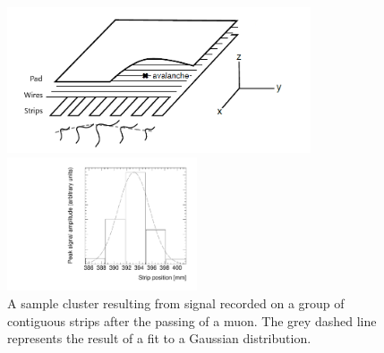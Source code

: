 \newpage
\thispagestyle{empty}
\begin{figure}
    \centering
    \includegraphics[width = 0.8\textwidth]{figures/mwpc_lefebvre_thesis_gatti.png}
    \caption{Schematic diagram representing the three types of electrodes in a sTGC detector. The position of the ionization avalanche is extracted from the wires and strips that picked up the avalanche signal. The signals on individual strips are sketched. Clustering is the process by which a Gaussian function (represented by the grey dashed line) is fitted to the distribution of the signal amplitude on individual contiguous strips; a sample cluster is shown in Figure~\ref{fig:sample_cluster}. In this work, the $x$($y$)-coordinate will always refer to the coordinate perpendicular to the wires (strips). The $z$-coordinate is perpendicular to the sTGC surface~\cite{lefebvre_thesis, gatti_optimum_1979}.}
    \label{fig:mwpc_coords}
    \vspace*{\floatsep}
    \centering
    \includegraphics[width = 0.5\textwidth]{figures/sample_cluster_QL2C04_event5_layer2.pdf}
    \caption{A sample cluster resulting from signal recorded on a group of contiguous strips after the passing of a muon. The grey dashed line represents the result of a fit to a Gaussian distribution.}
    \label{fig:sample_cluster}
\end{figure}
\newpage
\restoregeometry

